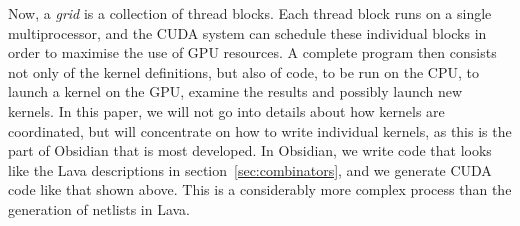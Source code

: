 Now, a {\em grid} is a collection of thread blocks. Each thread block runs
on a single multiprocessor, and the CUDA system can schedule these individual
blocks in order to maximise the use of GPU resources. A complete program
then consists not only of the kernel definitions, but also of code, to be
run on the CPU, to launch a kernel on the GPU, examine the results and
possibly launch new kernels. In this paper, we will not go into details
about how kernels are coordinated, but will concentrate on how to write
individual kernels, as this is the part of Obsidian that is most developed.
In Obsidian, we write code that looks like the Lava descriptions in
section~\ref{sec:combinators}, and we generate CUDA code like that shown
above. This is a considerably more complex process than the generation of
netlists in Lava.


